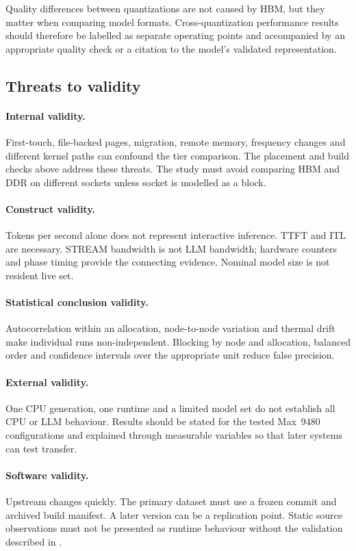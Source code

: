 Quality differences between quantizations are not caused by HBM, but
they matter when comparing model formats.  Cross-quantization
performance results should therefore be labelled as separate operating
points and accompanied by an appropriate quality check or a citation
to the model's validated representation.

\subsection{Threats to validity}

\paragraph{Internal validity.}
First-touch, file-backed pages, migration, remote memory, frequency
changes and different kernel paths can confound the tier comparison.
The placement and build checks above address these threats.  The study
must avoid comparing HBM and DDR on different sockets unless socket is
modelled as a block.

\paragraph{Construct validity.}
Tokens per second alone does not represent interactive inference.
TTFT and ITL are necessary.  STREAM bandwidth is not LLM bandwidth;
hardware counters and phase timing provide the connecting evidence.
Nominal model size is not resident live set.

\paragraph{Statistical conclusion validity.}
Autocorrelation within an allocation, node-to-node variation and
thermal drift make individual runs non-independent.  Blocking by node
and allocation, balanced order and confidence intervals over the
appropriate unit reduce false precision.

\paragraph{External validity.}
One CPU generation, one runtime and a limited model set do not establish
all CPU or LLM behaviour.  Results should be stated for the tested
Max~9480 configurations and explained through measurable variables so
that later systems can test transfer.

\paragraph{Software validity.}
Upstream \lcpp{} changes quickly.  The primary dataset must use a frozen
commit and archived build manifest.  A later version can be a
replication point.  Static source observations must not be presented as
runtime behaviour without the validation described in
.

